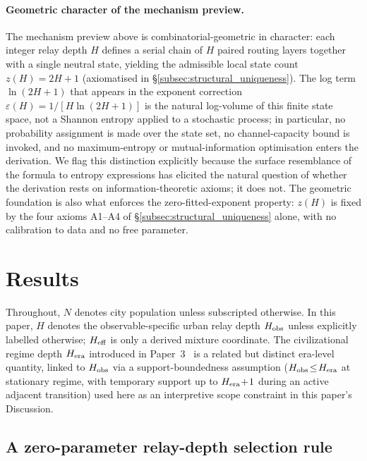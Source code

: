 \paragraph{Geometric character of the mechanism preview.}
The mechanism preview above is combinatorial-geometric in character: each
integer relay depth $H$ defines a serial chain of $H$ paired routing layers
together with a single neutral state, yielding the admissible local state
count $z(H)=2H+1$ (axiomatised in
\S\ref{subsec:structural_uniqueness}).
The log term $\ln(2H+1)$ that appears in the exponent correction
$\varepsilon(H)=1/[H\ln(2H+1)]$ is the natural log-volume of this finite
state space, not a Shannon entropy applied to a stochastic process;
in particular, no probability assignment is made over the state set,
no channel-capacity bound is invoked, and no maximum-entropy or
mutual-information optimisation enters the derivation.
We flag this distinction explicitly because the surface resemblance of the
formula to entropy expressions has elicited the natural question of whether
the derivation rests on information-theoretic axioms; it does not.
The geometric foundation is also what enforces the zero-fitted-exponent
property: $z(H)$ is fixed by the four axioms A1--A4 of
\S\ref{subsec:structural_uniqueness} alone, with no calibration to data
and no free parameter.

\section{Results}

Throughout, $N$ denotes city population unless subscripted otherwise. In this paper, $H$ denotes the observable-specific urban relay depth $H_{\rm obs}$ unless explicitly labelled otherwise; $H_{\rm eff}$ is only a derived mixture coordinate. The civilizational regime depth $H_{\rm era}$ introduced in Paper~3~\cite{Kato2026c} is a related but distinct era-level quantity, linked to $H_{\rm obs}$ via a support-boundedness assumption ($H_{\rm obs}\!\leq\!H_{\rm era}$ at stationary regime, with temporary support up to $H_{\rm era}\!+\!1$ during an active adjacent transition) used here as an interpretive scope constraint in this paper's Discussion.

\subsection{A zero-parameter relay-depth selection rule}

